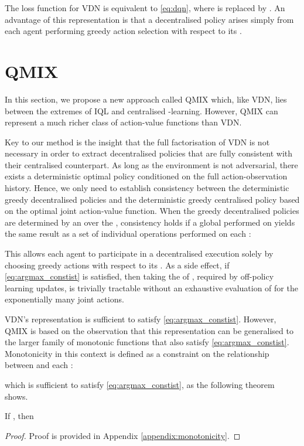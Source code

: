 \documentclass[twoside,11pt]{article}
\begin{document}
The loss function for VDN is equivalent to \eqref{eq:dqn}, where  is replaced by .  An advantage of this representation is that a decentralised policy arises simply from each agent performing greedy action selection with respect to its . 
 \section{QMIX}

\label{sec:methods}

In this section, we propose a new approach called QMIX which, like VDN, lies 
between the extremes of IQL and centralised -learning. However, QMIX can represent a much richer class of action-value functions than VDN. 

Key to our method is the insight that the full factorisation of VDN is not 
necessary in order to extract decentralised policies that are fully 
consistent with their centralised counterpart.
As long as the environment is not adversarial, there exists a deterministic optimal policy conditioned 
on the full action-observation history.
Hence, we only need to establish consistency between the deterministic greedy 
decentralised policies and the deterministic greedy centralised policy based 
on the optimal joint action-value function.
When the greedy decentralised policies are determined by an  over the 
, 
consistency holds if a 
global  performed on  yields the same result as a set of 
individual  operations performed on each :

This allows each agent  to participate in a decentralised execution solely 
by choosing greedy actions with respect to its .
As a side effect, if \eqref{eq:argmax_constist} is satisfied, then taking the 
 of , required by off-policy learning updates, is trivially 
tractable without an exhaustive evaluation of  for the exponentially 
many joint actions.

VDN's representation is sufficient to satisfy \eqref{eq:argmax_constist}. 
However, QMIX is based on the observation that this representation can be 
generalised to the larger family of monotonic functions that also satisfy 
\eqref{eq:argmax_constist}.
Monotonicity in this context is defined as a constraint on the relationship 
between  and each :

which is sufficient
to satisfy 
\eqref{eq:argmax_constist}, as the following theorem shows.
	\begin{theorem} 
		If ,   then
		
	\end{theorem}
	\begin{proof}
	Proof is provided in Appendix \ref{appendix:monotonicity}.
	\end{proof}
\end{document}
